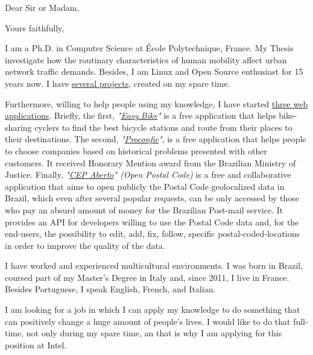 \date{October 30, 2015}
\opening{Dear Sir or Madam,}
\closing{Yours faithfully,}
\makelettertitle

I am a Ph.D. in Computer Science at École Polytechnique, France. My Thesis investigate how the routinary characteristics of human mobility affect urban network traffic demands. Besides, I am Linux and Open Source enthusiast for 15 years now. I have \hyperref[sec:open_source]{several projects}, created on my spare time.

Furthermore, willing to help people using my knowledge, I have started \hyperref[sec:web_app]{three web applications}. Briefly, the first, \textit{"\href{http://easy.bike}{Easy.Bike}"} is a free application that helps bike-sharing cyclers to find the best bicycle stations and route from their places to their destinations. The second, \textit{"\href{http://www.proconfie.com}{Proconfie}"}, is a free application that helps people to choose companies based on historical problems presented with other customers. It received Honorary Mention award from the Brazilian Ministry of Justice. Finally, \textit{"\href{http://www.cepaberto.com}{CEP Aberto}" (Open Postal Code)} is a free and collaborative application that aims to open publicly the Postal Code geolocalized data in Brazil, which even after several popular requests, can be only accessed by those who pay an absurd amount of money for the Brazilian Post-mail service. It provides an API for developers willing to use the Postal Code data and, for the end-users, the possibility to edit, add, fix, follow, specific postal-coded-locations in order to improve the quality of the data.

I have worked and experienced multicultural environments. I was born in Brazil, coursed part of my Master's Degree in Italy and, since 2011, I live in France. Besides Portuguese, I speak English, French, and Italian.

I am looking for a job in which I can apply my knowledge to do something that can positively change a huge amount of people's lives. I would like to do that full-time, not only during my spare time, an that is why I am applying for this position at Intel.

\makeletterclosing